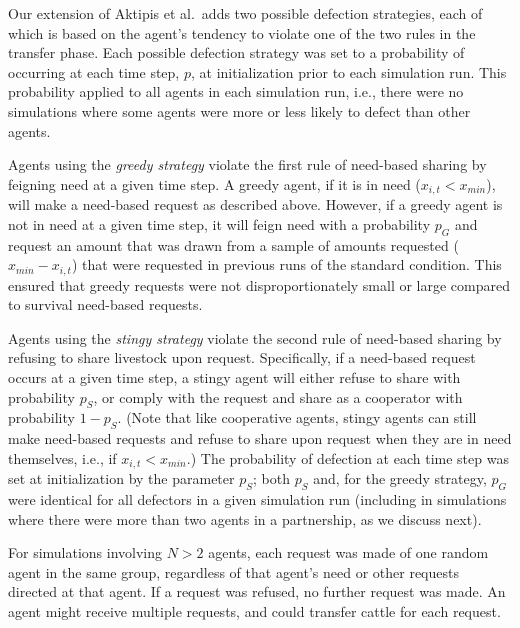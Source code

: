\documentclass[
]{article}
\begin{document}
Our extension of Aktipis et al.~adds two possible defection strategies, each of which is based on the agent's tendency to violate one of the two rules in the transfer phase. Each possible defection strategy was set to a probability of occurring at each time step, \(p\), at initialization prior to each simulation run. This probability applied to all agents in each simulation run, i.e., there were no simulations where some agents were more or less likely to defect than other agents.

Agents using the \emph{greedy strategy} violate the first rule of need-based sharing by feigning need at a given time step. A greedy agent, if it is in need (\(x_{i,t} < x_{min}\)), will make a need-based request as described above. However, if a greedy agent is not in need at a given time step, it will feign need with a probability \(p_G\) and request an amount that was drawn from a sample of amounts requested (\(x_{min} - x_{i,t}\)) that were requested in previous runs of the standard condition. This ensured that greedy requests were not disproportionately small or large compared to survival need-based requests.

Agents using the \emph{stingy strategy} violate the second rule of need-based sharing by refusing to share livestock upon request. Specifically, if a need-based request occurs at a given time step, a stingy agent will either refuse to share with probability \(p_S\), or comply with the request and share as a cooperator with probability \(1-p_S\). (Note that like cooperative agents, stingy agents can still make need-based requests and refuse to share upon request when they are in need themselves, i.e., if \(x_{i,t} < x_{min}\).) The probability of defection at each time step was set at initialization by the parameter \(p_S\); both \(p_S\) and, for the greedy strategy, \(p_G\) were identical for all defectors in a given simulation run (including in simulations where there were more than two agents in a partnership, as we discuss next).

For simulations involving \(N>2\) agents, each request was made of one random agent in the same group, regardless of that agent's need or other requests directed at that agent. If a request was refused, no further request was made. An agent might receive multiple requests, and could transfer cattle for each request.
\end{document}
